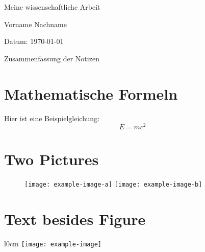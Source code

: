 \documentclass[12pt, a4paper]{article}
\begin{document}
	
	\begin{titlepage}
		\centering
		{\LARGE Meine wissenschaftliche Arbeit}\par
		\vspace{2cm}
		{\Large Vorname Nachname}\par
		\vspace{1cm}
		{\large Datum: \today}\par
		\vspace{3cm}
		\vfill
		{\large Zusammenfassung der Notizen}\par
\end{titlepage}
			
	\tableofcontents
	\newpage
	
	
\section{Mathematische Formeln}
Hier ist eine Beispielgleichung:
\begin{equation}
	E = mc^2
\end{equation}

\section{Two Pictures}

\begin{figure}[h]
	\texttt{[image: example-image-a]}
	\hfill
	\texttt{[image: example-image-b]}
\end{figure}

\section{Text besides Figure}

\lipsum[1]

\begin{wrapfigure}{l}{0cm}
	\texttt{[image: example-image]}
\end{wrapfigure}

\lipsum[1]
\end{document}
